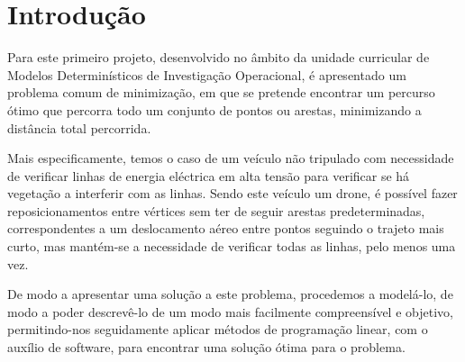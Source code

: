 \chapter{Introdução}

Para este primeiro projeto, desenvolvido no âmbito da unidade curricular de Modelos Determinísticos de Investigação Operacional, é apresentado um problema comum de minimização, em que se pretende encontrar um percurso ótimo que percorra todo um conjunto de pontos ou arestas, minimizando a distância total percorrida. 

Mais especificamente, temos o caso de um veículo não tripulado com necessidade de verificar linhas de energia eléctrica em alta tensão para verificar se há vegetação a interferir com as linhas. Sendo este veículo um drone, é possível fazer reposicionamentos entre vértices sem ter de seguir arestas predeterminadas, correspondentes a um deslocamento aéreo entre pontos seguindo o trajeto mais curto, mas mantém-se a necessidade de verificar todas as linhas, pelo menos uma vez.

De modo a apresentar uma solução a este problema, procedemos a modelá-lo, de modo a poder descrevê-lo de um modo mais facilmente compreensível e objetivo, permitindo-nos seguidamente aplicar métodos de programação linear, com o auxílio de software, para encontrar uma solução ótima para o problema.